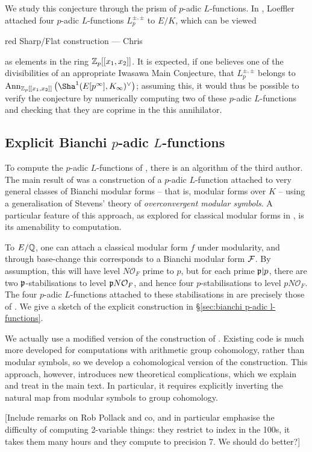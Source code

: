 \documentclass[a4paper,11pt]{article}
\newcommand{\CWnote}[1]{
 \begin{color}{red}
 \marginpar{$\spadesuit$} #1
  --- Chris
 \end{color}
}
\newcommand{\CWnote}[1]{

}
\newcommand{\cO}{\mathcal{O}}
\numberwithin{equation}{section}
\begin{document}
We study this conjecture through the prism of $p$-adic $L$-functions. In \cite{Loe14}, Loeffler attached four $p$-adic $L$-functions $L_p^{\pm,\pm}$ to $E/K$, which can be viewed \CWnote{Sharp/Flat construction} as elements in the ring $\mathbb{Z}_p[[x_1,x_2]]$. It is expected, if one believes one of the divisibilities of an appropriate Iwasawa Main Conjecture, that $L_p^{\pm,\pm}$ belongs to $\mathrm{Ann}_{\Z_p[[x_1,x_2]]}\left(\Sha^1(E[p^\infty],K_\infty)^\vee\right)$; assuming this, it would thus be possible to verify the conjecture by numerically computing two of these $p$-adic $L$-functions and checking that they are coprime in the this annihilator. 

\subsection{Explicit Bianchi $p$-adic $L$-functions}
To compute the $p$-adic $L$-functions of \cite{Loe14}, there is an algorithm of the third author. The main result of \cite{Wil17} was a construction of a $p$-adic $L$-function attached to very general classes of Bianchi modular forms -- that is, modular forms over $K$ -- using a generalisation of Stevens' theory of \emph{overconvergent modular symbols}.  A particular feature of this approach, as explored for classical modular forms in \cite{PS11}, is its amenability to computation.

To $E/\mathbb{Q}$, one can attach a classical modular form $f$ under modularity, and through base-change this corresponds to a Bianchi modular form $\mathcal{F}$. By assumption, this will have level $N\cO_F$ prime to $p$, but for each prime $\mathfrak{p}|p$, there are two $\mathfrak{p}$-stabilisations to level $\pri N\cO_F$, and hence four $p$-stabilisations to level $pN\cO_F$. The four $p$-adic $L$-functions attached to these stabilisations in \cite{Wil17} are precisely those of \cite{Loe14}. We give a sketch of the explicit construction in \S\ref{sec:bianchi p-adic l-functions}.

We actually use a modified version of the construction of \cite{Wil17}. Existing code is much more developed for computations with arithmetic group cohomology, rather than modular symbols, so we develop a cohomological version of the construction. This approach, however, introduces new theoretical complications, which we explain and treat in the main text. In particular, it requires explicitly inverting the natural map from modular symbols to group cohomology.

[Include remarks on Rob Pollack and co, and in particular emphasise the difficulty of computing 2-variable things: they restrict to index in the 100s, it takes them many hours and they compute to precision 7. We should do better?]
\end{document}
